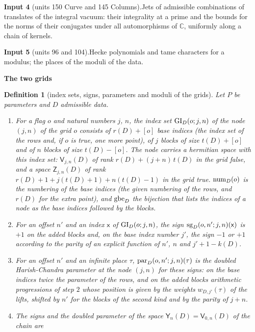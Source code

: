 \documentclass[11pt,a4paper]{article}
\newcommand{\sect}[2]{\refstepcounter{section}\label{#2}\par\addvspace{19pt plus 4pt minus 2pt}\Needspace{7\baselineskip}%
  \noindent\llap{{\fontsize{13.2}{16}\selectfont\bfseries\color{inkfaint}\thesection}\hspace{9pt}}%
  {\fontsize{13.2}{16}\selectfont\bfseries\color{ink}#1}\par\nopagebreak\vspace{-1pt}}
\theoremstyle{plainx}
\theoremstyle{uprightx}
\newtheorem{definition}[theorem]{Definition}
\newcommand{\sV}{\mathsf{V}}
\newcommand{\sZ}{\mathsf{Z}}
\newcommand{\sY}{\mathsf{Y}}
\newcommand{\CC}{\mathbb{C}}
\begin{document}
{\vspace{3pt}\textbf{Input 4} (units 150 Curve and 145 Columns).\enspace Jets of admissible combinations of
translates of the integral vacuum: their integrality at a prime and the bounds for the norms of their conjugates
under all automorphisms of $\CC$, uniformly along a chain of kernels.

\vspace{3pt}\textbf{Input 5} (units 96 and 104).\enspace Hecke polynomials and tame characters for a modulus; the
places of the moduli of the data.}

\sect{The two grids}{s:grid}
\begin{definition}[index sets, signs, parameters and moduli of the grids]\label{d:grid}
Let $P$ be parameters and $D$ admissible data.
\begin{enumerate}[label=\textup{(\alph*)},leftmargin=2.3em,itemsep=1pt]
\item For a flag $o$ and natural numbers $j$, $n$, the index set $\operatorname{GI}_{D}(o;j,n)$ of the node $(j,n)$ of
the grid $o$ consists of $r(D)+[o]$ base indices (the index set of the rows and, if $o$ is true, one more point),
of $j$ blocks of size $t(D)+[o]$ and of $n$ blocks of size $t(D)-[o]$. The node carries a hermitian space with
this index set: $\sV_{j,n}(D)$ of rank $r(D)+(j+n)\,t(D)$ in the grid false, and a space $\sZ_{j,n}(D)$ of rank
$r(D)+1+j(t(D)+1)+n(t(D)-1)$ in the grid true. $\operatorname{num}_{D}(o)$ is the numbering of the base indices (the given
numbering of the rows, and $r(D)$ for the extra point), and $\operatorname{gbe}_{D}$ the bijection that lists the indices
of a node as the base indices followed by the blocks.
\item For an offset $n'$ and an index $\mathsf{x}$ of $\operatorname{GI}_{D}(o;j,n)$, the sign
$\operatorname{sg}_{D}(o,n';j,n)(\mathsf{x})$ is $+1$ on the added blocks and, on the base index number $j'$, the sign
$-1$ or $+1$ according to the parity of an explicit function of $n'$, $n$ and $j'+1-k(D)$.
\item For an offset $n'$ and an infinite place $\tau$, $\operatorname{par}_{D}(o,n';j,n)(\tau)$ is the doubled
Harish-Chandra parameter at the node $(j,n)$ for these signs: on the base indices twice the parameter of the rows,
and on the added blocks arithmetic progressions of step $2$ whose position is given by the weights
$w_{D,j'}(\tau)$ of the lifts, shifted by $n'$ for the blocks of the second kind and by the parity of $j+n$.
\item The signs and the doubled parameter of the space $\sY_n(D)=\sV_{0,n}(D)$ of the chain are

\end{enumerate}
\end{definition}
\end{document}
